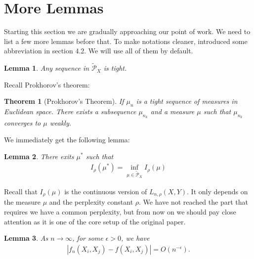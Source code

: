 \documentclass[10pt]{article}
\newtheorem{lemma}{\bf Lemma}
\newtheorem*{theorem*}{\bf Theorem}
\newenvironment{Proof of lemma}{\noindent{\bf Proof of Lemma}}{\hfill$\Box$\newline}
\newenvironment{Proof of claim}{\noindent{\bf Proof of claim}}{\hfill$\Box$\newline}
\newenvironment{Proof of theorem}{\noindent{\bf Proof of Theorem}}{\hfill\scriptsize{$\Box$}\newline}
\newenvironment{Proof of theorems}{\noindent{\bf Proof of Theorems}}{\hfill$\Box$\newline}
\newenvironment{Proof of proposition}{\noindent{\bf Proof of Proposition}}{\hfill$\Box$\newline}
\newenvironment{Proof of propositions}{\noindent{\bf Proof of Propositions}}{\hfill$\Box$\newline}
\newenvironment{Proof of exercise}{\noindent{\it Proof of Exercise:}}{\hfill$\Box$}
\numberwithin{equation}{section}
\begin{document}
\section{More Lemmas}
Starting this section we are gradually approaching our point of work. We need
to list a few more lemmas before that. To make notations cleaner,
\cite{auffinger-tsne} introduced some abbreviation in section 4.2. We will use
all of them by default.
\begin{lemma}
    Any sequence in $\tilde{\mathcal{P}}_X$ is tight.
\end{lemma}
Recall Prokhorov's theorem:
\begin{theorem*}[Prokhorov's Theorem]
    If $\mu_n$ is a tight sequence of measures in Euclidean space. There exists a subsequence $\mu_{n_k}$ and a measure $\mu$ such that $\mu_{n_k}$ converges to $\mu$ weakly.
\end{theorem*}
We immediately get the following lemma:
\begin{lemma} \label{mu_star_lemma}
    There exits $\mu^*$ such that
    \begin{align}
        I_{\rho}(\mu^*) = \inf_{\mu \in \tilde{\mathcal{P}}_X} I_{\rho}(\mu)
    \end{align}
\end{lemma}
Recall that $I_{\rho}(\mu)$ is the continuous version of $L_{n,\rho}(X,Y)$. It only depends on the measure $\mu$ and the perplexity constant $\rho$. We have not reached the part that requires we have a common perplexity, but from now on we should pay close attention as it is one of the core setup of the original paper.
\begin{lemma}
    As $n \to \infty$, for some $\epsilon>0$, we have
    \begin{align}
        |f_n(X_i,X_j)-f(X_i,X_j)| = O(n^{-\epsilon}).
    \end{align}
\end{lemma}
\end{document}
